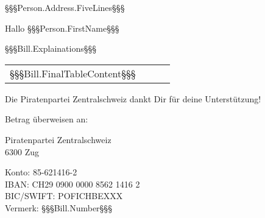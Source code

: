 ﻿\documentclass[ppsletter,fontsize=11pt,foldmarks=false ]{scrlttr2}
\begin{document}


\begin{letter}{%
    §§§Person.Address.FiveLines§§§
}

\enlargethispage{10cm}

\opening{Hallo §§§Person.FirstName§§§}

§§§Bill.Explainations§§§

\begin{tabular}{ l r r l }
§§§Bill.FinalTableContent§§§
\end{tabular}

Die Piratenpartei Zentralschweiz dankt Dir für deine Unterstützung!

\vspace{1cm}
Betrag überweisen an:

Piratenpartei Zentralschweiz \\
6300 Zug

Konto: 85-621416-2 \\
IBAN: CH29 0900 0000 8562 1416 2 \\
BIC/SWIFT: POFICHBEXXX \\
Vermerk: §§§Bill.Number§§§

\end{letter}%
\end{document}
